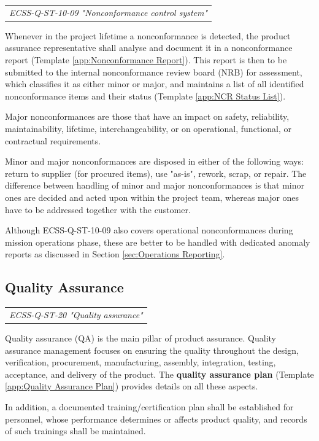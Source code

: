 \begin{tabular}{l}
\textit{ECSS-Q-ST-10-09 "Nonconformance control system" \cite{ECSS-Q-ST-10-09}}
\end{tabular}

Whenever in the project lifetime a nonconformance is detected, the product assurance representative shall analyse and document it in a nonconformance report (Template \ref{app:Nonconformance Report}). This report is then to be submitted to the internal nonconformance review board (NRB) for assessment, which classifies it as either minor or major, and maintains a list of all identified nonconformance items and their status (Template \ref{app:NCR Status List}).

Major nonconformances are those that have an impact on safety, reliability, maintainability, lifetime, interchangeability, or on operational, functional, or contractual requirements.

Minor and major nonconformances are disposed in either of the following ways: return to supplier (for procured items), use "as-is", rework, scrap, or repair. The difference between handling of minor and major nonconformances is that minor ones are decided and acted upon within the project team, whereas major ones have to be addressed together with the customer.
 
Although ECSS-Q-ST-10-09 also covers operational nonconformances during mission operations phase, these are better to be handled with dedicated anomaly reports as discussed in Section \ref{sec:Operations Reporting}.

\subsection{Quality Assurance}

\begin{tabular}{l}
\textit{ECSS-Q-ST-20 "Quality assurance" \cite{ECSS-Q-ST-20}}
\end{tabular}

Quality assurance (QA) is the main pillar of product assurance. Quality assurance management focuses on ensuring the quality throughout the design, verification, procurement, manufacturing, assembly, integration, testing, acceptance, and delivery of the product. The \textbf{quality assurance plan} (Template \ref{app:Quality Assurance Plan}) provides details on all these aspects. 

In addition, a documented training/certification plan shall be established for personnel, whose performance determines or affects product quality, and records of such trainings shall be maintained.

